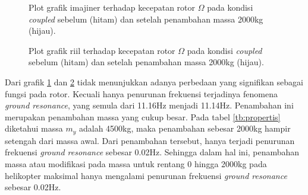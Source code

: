 \begin{figure}[H]
	\centering
	\caption{Plot grafik imajiner terhadap kecepatan rotor $\Omega$ pada kondisi \textit{coupled} sebelum (hitam) dan setelah penambahan massa 2000kg (hijau).}
	\label{fig:imag(modified)_3}
\end{figure}

\begin{figure}[H]
	\centering
	\caption{Plot grafik riil terhadap kecepatan rotor $\Omega$ pada kondisi \textit{coupled} sebelum (hitam) dan setelah penambahan massa 2000kg (hijau).}
	\label{fig:real(modified)_3}
\end{figure}

Dari grafik \ref{fig:imag(modified)_3} dan \ref{fig:real(modified)_3} tidak menunjukkan adanya perbedaan yang signifikan sebagai fungsi pada rotor. Kecuali hanya penurunan frekuensi terjadinya fenomena \textit{ground resonance}, yang semula dari 11.16Hz menjadi 11.14Hz. Penambahan ini merupakan penambahan massa yang cukup besar. Pada tabel \ref{tb:propertis} diketahui massa $m_y$ adalah 4500kg, maka penambahan sebesar 2000kg hampir setengah dari massa awal. Dari penambahan tersebut, hanya terjadi penurunan frekuensi \textit{ground resonance} sebesar 0.02Hz. Sehingga dalam hal ini, penambahan massa atau modifikasi pada massa untuk rentang 0 hingga 2000kg pada helikopter maksimal hanya mengalami penurunan frekuensi \textit{ground resonance} sebesar 0.02Hz.
